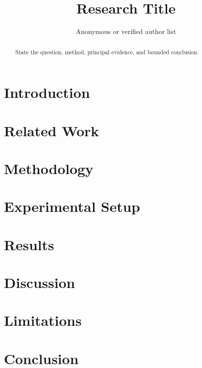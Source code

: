 \documentclass{article}
\title{Research Title}
\author{Anonymous or verified author list}
\date{}
\begin{document}
\maketitle
\begin{abstract}
State the question, method, principal evidence, and bounded conclusion.
\end{abstract}

\section{Introduction}
\section{Related Work}
\section{Methodology}
\section{Experimental Setup}
\section{Results}
\section{Discussion}
\section{Limitations}
\section{Conclusion}



\end{document}
